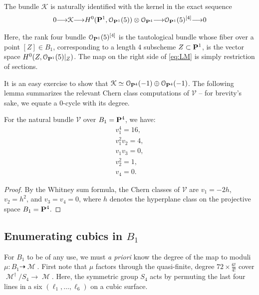 \documentclass[12pt,reqno]{amsart}
\DeclareMathOperator{\M}{\mathcal{M}}
\renewcommand{\to}{{\longrightarrow}}
\numberwithin{equation}{section}
\renewcommand{\O}{\mathcal O}
\newcommand{\V}{\mathcal V}
\begin{document}
The bundle $\mathcal{K}$ is naturally identified with the kernel in
the exact sequence
\begin{align}
  \label{eq:LM}
  0 \to \mathcal{K} \to H^{0}(\P^1, \O_{\P^{1}}(5)) \otimes \O_{\P^4} \to \O_{\P^{1}}(5)^{[4]} \to 0 
\end{align}

Here, the rank four bundle $\O_{\P^{1}}(5)^{[4]}$ is the tautological
bundle whose fiber over a point $[Z] \in B_{1}$, corresponding to a
length $4$ subscheme $Z \subset \P^{1}$, is the vector space
$H^{0}(Z, \O_{\P^{1}}(5)|_{Z})$.  The map on the right side of
\eqref{eq:LM} is simply restriction of sections.

It is an easy exercise to show that
$\mathcal{K} \simeq \O_{\P^{4}}(-1) \oplus \O_{\P^{4}}(-1)$.  The
following lemma summarizes the relevant Chern class computations of
$\V$ -- for brevity's sake, we equate a $0$-cycle with its degree.

\begin{lemma}
  \label{lemma:chernB1}
  For the natural bundle $\V$ over $B_1= \P^{4}$, we have:
  \begin{align}\nonumber
    v_{1}^{4} = 16,\\\nonumber
    v_{1}^{2}v_{2} = 4,\\\nonumber
    v_{1}v_{3} =0,\\\nonumber
    v_2^{2} = 1,\\\nonumber
    v_{4} = 0.
  \end{align}
\end{lemma}

\begin{proof}
  By the Whitney sum formula, the Chern classes of $\V$ are
  $v_{1} = -2h$, $v_{2}=h^2$, and $v_{3}= v_{4}=0$, where $h$ denotes
  the hyperplane class on the projective space $B_1 = \P^{4}$.
\end{proof}









\subsection{Enumerating cubics in $B_1$}
\label{sec:enum-cubics-b_1}


For $B_1$ to be of any use, we must {\sl a priori} know the degree of
the map to moduli $\mu: B_1 \dashrightarrow \M$.  First note that
$\mu$ factors through the quasi-finite, degree
$72 \times \frac{6!}{4!}$ cover $\M^{\dagger}/S_{4} \to \M$.  Here,
the symmetric group $S_4$ acts by permuting the last four lines in a
six $(\ell_{1}, \dots, \ell_{6})$ on a cubic surface.
\end{document}
